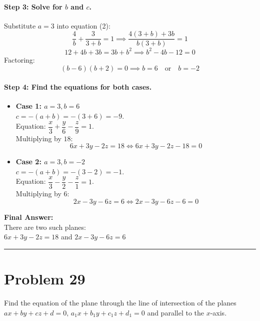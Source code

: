 \documentclass[11pt,a4paper]{article}
\begin{document}
\paragraph{Step 3: Solve for $b$ and $c$.}
Substitute $a = 3$ into equation (2):
$$\frac{4}{b} + \frac{3}{3 + b} = 1 \implies \frac{4(3 + b) + 3b}{b(3 + b)} = 1$$
$$12 + 4b + 3b = 3b + b^2 \implies b^2 - 4b - 12 = 0$$
Factoring:
$$(b - 6)(b + 2) = 0 \implies b = 6 \quad \text{or} \quad b = -2$$

\paragraph{Step 4: Find the equations for both cases.}
\begin{itemize}
    \item \textbf{Case 1: $a = 3, b = 6$}\\
    $c = -(a + b) = -(3 + 6) = -9$.\\
    Equation: $\dfrac{x}{3} + \dfrac{y}{6} - \dfrac{z}{9} = 1$.\\
    Multiplying by $18$:
    $$6x + 3y - 2z = 18 \iff 6x + 3y - 2z - 18 = 0$$
    
    \item \textbf{Case 2: $a = 3, b = -2$}\\
    $c = -(a + b) = -(3 - 2) = -1$.\\
    Equation: $\dfrac{x}{3} - \dfrac{y}{2} - \dfrac{z}{1} = 1$.\\
    Multiplying by $6$:
    $$2x - 3y - 6z = 6 \iff 2x - 3y - 6z - 6 = 0$$
\end{itemize}

\begin{resultbox}
\textbf{Final Answer:}\\
There are two such planes:\\
$\boxed{6x + 3y - 2z = 18}$ \quad and \quad $\boxed{2x - 3y - 6z = 6}$
\end{resultbox}

\vspace{0.4cm}
\hrule
\vspace{0.4cm}

\section{Problem 29}
\begin{problembox}[Problem 29]
Find the equation of the plane through the line of intersection of the planes $ax + by + cz + d = 0, \, a_1 x + b_1 y + c_1 z + d_1 = 0$ and parallel to the $x$-axis.
\end{problembox}
\end{document}
